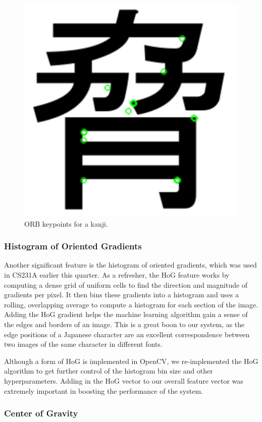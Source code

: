 \documentclass[10pt,twocolumn,letterpaper]{article}
\begin{document}
\begin{figure}[t]
    \centering
    \includegraphics[width=0.7\columnwidth]{../orb.png}
    \caption{ORB keypoints for a kanji.}
\end{figure}

\subsubsection{Histogram of Oriented Gradients}

Another significant feature is the histogram of oriented gradients, which was used in CS231A earlier this quarter. As a refresher, the HoG feature works by computing a dense grid of uniform cells to find the direction and magnitude of gradients per pixel. It then bins these gradients into a histogram and uses a rolling, overlapping average to compute a histogram for each section of the image. Adding the HoG gradient helps the machine learning algorithm gain a sense of the edges and borders of an image. This is a great boon to our system, as the edge positions of a Japanese character are an excellent correspondence between two images of the same character in different fonts.

Although a form of HoG is implemented in OpenCV, we re-implemented the HoG algorithm to get further control of the histogram bin size and other hyperparameters. Adding in the HoG vector to our overall feature vector was extremely important in boosting the performance of the system.

\subsubsection{Center of Gravity}
\end{document}
